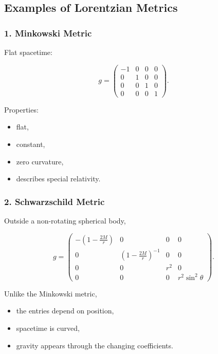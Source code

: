 \documentclass[12pt,a4paper]{article}
\theoremstyle{notespace}
\begin{document}
\subsection{Examples of Lorentzian Metrics}

\subsubsection*{1. Minkowski Metric}

Flat spacetime:

\[
g=
\begin{pmatrix}
	-1&0&0&0\\
	0&1&0&0\\
	0&0&1&0\\
	0&0&0&1
\end{pmatrix}.
\]

Properties:

\begin{itemize}
	\item flat,
	\item constant,
	\item zero curvature,
	\item describes special relativity.
\end{itemize}


\subsubsection*{2. Schwarzschild Metric}

Outside a non-rotating spherical body,

\[
g=
\begin{pmatrix}
	-\left(1-\frac{2M}{r}\right)&0&0&0\\
	0&\left(1-\frac{2M}{r}\right)^{-1}&0&0\\
	0&0&r^2&0\\
	0&0&0&r^2\sin^2\theta
\end{pmatrix}.
\]

Unlike the Minkowski metric,

\begin{itemize}
	\item the entries depend on position,
	\item spacetime is curved,
	\item gravity appears through the changing coefficients.
\end{itemize}

\end{document}
